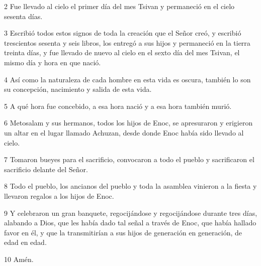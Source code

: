 \par 2 Fue llevado al cielo el primer día del mes Tsivan y permaneció en el cielo sesenta días.

\par 3 Escribió todos estos signos de toda la creación que el Señor creó, y escribió trescientos sesenta y seis libros, los entregó a sus hijos y permaneció en la tierra treinta días, y fue llevado de nuevo al cielo en el sexto día del mes Tsivan, el mismo día y hora en que nació.

\par 4 Así como la naturaleza de cada hombre en esta vida es oscura, también lo son su concepción, nacimiento y salida de esta vida.

\par 5 A qué hora fue concebido, a esa hora nació y a esa hora también murió.

\par 6 Metosalam y sus hermanos, todos los hijos de Enoc, se apresuraron y erigieron un altar en el lugar llamado Achuzan, desde donde Enoc había sido llevado al cielo.

\par 7 Tomaron bueyes para el sacrificio, convocaron a todo el pueblo y sacrificaron el sacrificio delante del Señor.

\par 8 Todo el pueblo, los ancianos del pueblo y toda la asamblea vinieron a la fiesta y llevaron regalos a los hijos de Enoc.

\par 9 Y celebraron un gran banquete, regocijándose y regocijándose durante tres días, alabando a Dios, que les había dado tal señal a través de Enoc, que había hallado favor en él, y que la transmitirían a sus hijos de generación en generación, de edad en edad.

\par 10 Amén.



